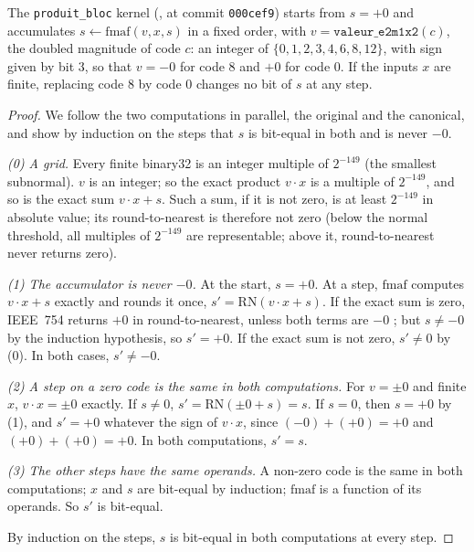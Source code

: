 \begin{proposition}\label{t3syn:prop:a1}
The \texttt{produit\_bloc} kernel (, at commit \texttt{000cef9}) starts from $s = +0$ and accumulates $s \leftarrow \mathrm{fmaf}(v, x, s)$ in a fixed order, with $v = \texttt{valeur\_e2m1x2}(c)$, the doubled magnitude of code $c$: an integer of $\{0, 1, 2, 3, 4, 6, 8, 12\}$, with sign given by bit 3, so that $v = -0$ for code 8 and $+0$ for code 0. If the inputs $x$ are finite, replacing code 8 by code 0 changes no bit of $s$ at any step.
\end{proposition}

\begin{proof}
We follow the two computations in parallel, the original and the canonical, and show by induction on the steps that $s$ is bit-equal in both and is never $-0$.

\emph{(0) A grid.} Every finite binary32 is an integer multiple of $2^{-149}$ (the smallest subnormal). $v$ is an integer; so the exact product $v \cdot x$ is a multiple of $2^{-149}$, and so is the exact sum $v\cdot x + s$. Such a sum, if it is not zero, is at least $2^{-149}$ in absolute value; its round-to-nearest is therefore not zero (below the normal threshold, all multiples of $2^{-149}$ are representable; above it, round-to-nearest never returns zero).

\emph{(1) The accumulator is never $-0$.} At the start, $s = +0$. At a step, $\mathrm{fmaf}$ computes $v \cdot x + s$ exactly and rounds it once, $s' = \mathrm{RN}(v\cdot x + s)$. If the exact sum is zero, IEEE~754 returns $+0$ in round-to-nearest, unless both terms are $-0$ \parencite{ieee754}; but $s \ne -0$ by the induction hypothesis, so $s' = +0$. If the exact sum is not zero, $s' \ne 0$ by (0). In both cases, $s' \ne -0$.

\emph{(2) A step on a zero code is the same in both computations.} For $v = \pm 0$ and finite $x$, $v \cdot x = \pm 0$ exactly. If $s \ne 0$, $s' = \mathrm{RN}(\pm 0 + s) = s$. If $s = 0$, then $s = +0$ by (1), and $s' = +0$ whatever the sign of $v\cdot x$, since $(-0) + (+0) = +0$ and $(+0) + (+0) = +0$. In both computations, $s' = s$.

\emph{(3) The other steps have the same operands.} A non-zero code is the same in both computations; $x$ and $s$ are bit-equal by induction; $\mathrm{fmaf}$ is a function of its operands. So $s'$ is bit-equal.

By induction on the steps, $s$ is bit-equal in both computations at every step.
\end{proof}

